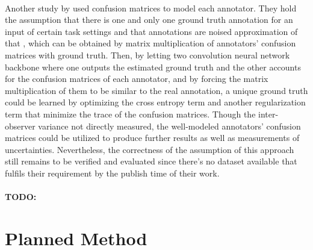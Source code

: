 \documentclass[12pt]{extarticle}
\begin{document}
\paragraph{}
Another study by \cite{zhang2020disentangling} used confusion matrices to
model each annotator. They hold the assumption that there is one and
only one ground truth annotation for an input of certain task settings and
that annotations are noised approximation of that
, which can be obtained by matrix multiplication of annotators' 
confusion matrices with ground truth. Then, by letting two convolution neural network backbone
where one outputs the estimated ground truth and the other accounts for the confusion matrices
of each annotator, and by forcing the matrix multiplication of them to be similar to the
real annotation, a unique ground truth could be learned by optimizing the cross entropy term
and another regularization term that minimize the trace of the confusion matrices.
Though the inter-observer variance not directly measured, the well-modeled annotators'
confusion matrices could be utilized to produce further results
as well as measurements of uncertainties.
Nevertheless, the correctness of the assumption of this approach
still remains to be verified and evaluated since there's no dataset available 
that fulfils their requirement by the publish time of their work.
\paragraph{}
\textbf{TODO: }

\section{Planned Method}
\end{document}
